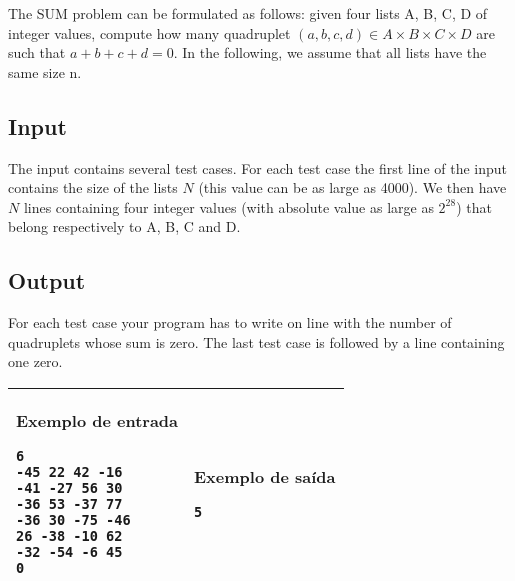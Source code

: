 The SUM problem can be formulated as follows: given four lists A, B, C, D of
integer values, compute how many quadruplet $(a,b,c,d) \in A \times B \times C \times D$
are such that $a+b+c+d=0$. In the following, we assume that all lists have
the same size n.

\subsection*{Input}

The input contains several test cases. For each test case the first line
of the input contains the size of the lists $N$ (this value
can be as large as 4000). We then have $N$ lines containing four integer values
(with absolute value as large as $2^{28}$) that belong respectively to A, B, C and D.


\subsection*{Output}

For each test case your program has to write on line with the number
of quadruplets whose sum is zero. The last test case is followed by a
line containing one zero.

\begin{table}[!h]
\centering
\begin{tabular}{|l|l|}
\hline
\begin{minipage}[t]{3in}
\textbf{Exemplo de entrada}
\begin{verbatim}
6
-45 22 42 -16
-41 -27 56 30
-36 53 -37 77
-36 30 -75 -46
26 -38 -10 62
-32 -54 -6 45
0
\end{verbatim}
\vspace{1mm}
\end{minipage}
&

\begin{minipage}[t]{3in}
\textbf{Exemplo de saída}
\begin{verbatim}
5
\end{verbatim}
\vspace{1mm}
\end{minipage} \\
\hline
\end{tabular}
\end{table}

\newpage
